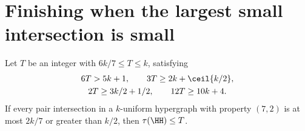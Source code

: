 \section{Finishing when the largest small intersection is small}\label{app:smallmax}
\begin{lemma}\label{lem:smallmax}
Let $T$ be an integer with $6k/7\le T\le k$, satisfying
\begin{equation}\label{eq:fourinteger}
 \begin{gathered}
 6T>5k+1,\qquad 3T\ge2k+\ceil{k/2},\\
 2T\ge3k/2+1/2,\qquad 12T\ge10k+4.
 \end{gathered}
\end{equation}
If every pair intersection in a $k$-uniform hypergraph with property
$(7,2)$ is at most $2k/7$ or greater than $k/2$, then $\tau(\HH)\le T$.
\end{lemma}
